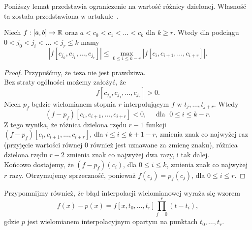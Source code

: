 \documentclass[oik, pdftex, man]{mgrwms}
\begin{document}
    Poniższy lemat przedstawia ograniczenie na wartość różnicy dzielonej. Własność ta została przedstawiona w artukule~\cite{UA}.
    \begin{lemma} \label{lem:4:wlasnosc_roznic_dzielonych_z_art_2009}
        Niech $f: [a,b] \rightarrow \mathbb{R}$ oraz $a < c_{0} <  c_{1} < \ldots < c_{k}$ dla $k \geq r$. Wtedy dla podciągu $0 < j_{0} < j_{i} < \ldots < j_{r} \leq k$ mamy
        \begin{equation*}
            \left| f[c_{j_{0}}, c_{j_{1}}, \ldots, c_{j_{r}}] \right| \leq \max_{0 \leq i \leq k-r} \left| f[c_{i}, c_{i+1}, \ldots, c_{i+r}] \right|.
        \end{equation*}
    \end{lemma}
    \begin{proof}
        Przypuśćmy, że teza nie jest prawdziwa. \\
        Bez straty ogólności możemy założyć, że
        \begin{equation*}
            f[c_{j_{0}}, c_{j_{1}}, \ldots, c_{j_{r}}]> 0.
        \end{equation*}
        Niech $p_{f}$ będzie wielomianem stopnia $r$ interpolującym $f$ w $t_{j}, \ldots, t_{j+r}$. Wtedy
        \begin{equation*}
            \left( f-p_{f} \right)[c_{i}, c_{i+1}, \ldots, c_{i+r}] < 0, \quad \text{ dla }\; 0 \leq i \leq k-r.
        \end{equation*}
        Z tego wynika, że różnica dzielona rzędu $r-1$ funkcji $\left( f-p_{f} \right)[c_{i}, c_{i+1}, \ldots, c_{i+r}]$, dla $i \leq i \leq k+1-r$, zmienia znak co najwyżej raz (przyjęcie wartości równej 0 również jest uznawane za zmienę znaku), różnica dzielona rzędu $r-2$ zmienia znak co najwyżej dwa razy, i tak dalej. \\
        Końcowo dostajemy, że $(f-p_{f})(c_{i})$, dla $0 \leq i \leq k$, zmienia znak co najwyżej $r$ razy. Otrzymujemy sprzeczność, ponieważ $f(c_{j}) = p_{f}(c_{j})$, dla $0 \leq i \leq r$.

    \end{proof}

    Przypomnijmy również, że błąd interpolacji wielomianowej wyraża się wzorem
    \begin{equation*} \label{eq:34:blad_interpolacji_lagrangea}
        f(x) - p(x) = f[x, t_{0}, \ldots, t_{r}] \prod_{j = 0}^{r} (t - t_{i}),
    \end{equation*}
    gdzie $p$ jest wielomianem interpolacyjnym opartym na punktach $t_{0}, \ldots, t_{r}$.
\end{document}
